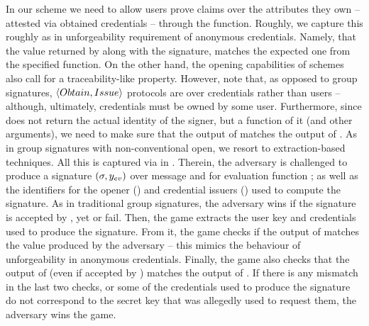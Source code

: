 In our \UAS scheme we need to allow users prove claims over the attributes they
own -- attested via obtained credentials -- through the \feval function.
Roughly, we capture this roughly as in unforgeability requirement of anonymous
credentials. Namely, that the \yeval value returned by \Sign along with the
signature, matches the expected one from the specified \feval function.
On the other hand, the opening capabilities of \UAS schemes also call for a
traceability-like property. However, note that, as opposed to group signatures,
$\langle Obtain,Issue \rangle$ protocols are over credentials rather than
users -- although, ultimately, credentials must be owned by some user.
Furthermore, since \Open
does not return the actual identity of the signer, but a function \finsp of it
(and other arguments), we need to make sure that the output of \Open
matches the output of \finsp. As in group signatures with non-conventional open,
we resort to extraction-based techniques. All this is captured via \ExpForgeSign
in . Therein, the adversary is challenged to
produce a signature $(\sigma,y_{ev})$ over message \msg and for evaluation
function \feval; as well as the identifiers for the opener (\oid) and
credential issuers (\siid) used to compute the signature. As in traditional
group signatures, the adversary wins if the signature is accepted by \Verify,
yet \Open or \Judge fail. Then, the game extracts the user key and
credentials used to produce the signature. From it, the game checks if the
output of \feval matches the \yeval value produced by the adversary -- this
mimics the behaviour of unforgeability in anonymous credentials. Finally, the
game also checks that the output of \Open (even if accepted by \Judge)
matches the output of \finsp. If there is any mismatch in the last two checks,
or some of the credentials used to produce the signature do not correspond to
the secret key that was allegedly used to request them, the adversary wins the
game.

